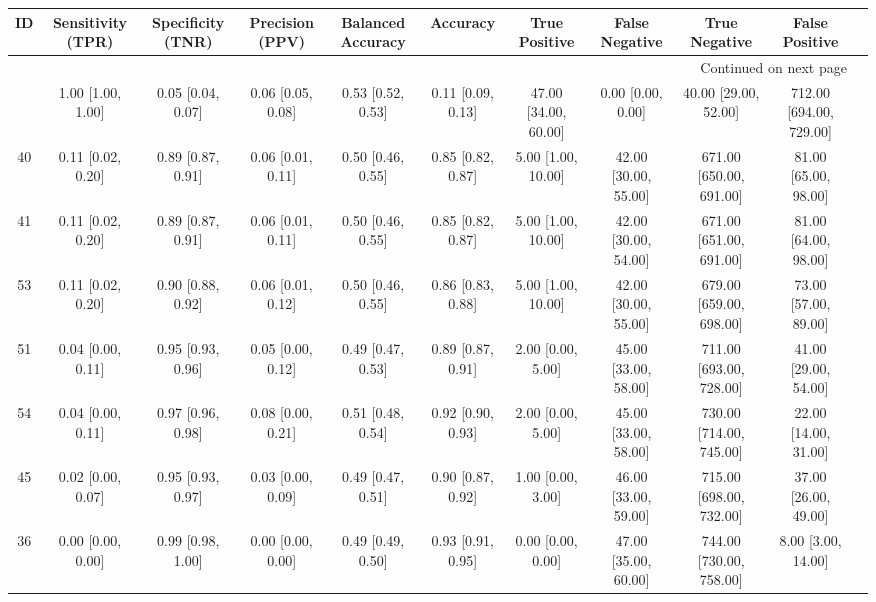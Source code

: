 \documentclass[8pt]{article}
\begin{document}
\begin{center}
\begin{footnotesize}
\begin{longtable}{|ccccccccccc|}
\toprule
 ID &  Sensitivity (TPR) &  Specificity (TNR) &    Precision (PPV) &  Balanced Accuracy &           Accuracy &         True Positive &        False Negative &            True Negative &           False Positive \\
\midrule
\endhead
\midrule
\multicolumn{10}{r}{{Continued on next page}} \\
\midrule
\endfoot

\bottomrule
\endlastfoot
 42 &  1.00 [1.00, 1.00] &  0.05 [0.04, 0.07] &  0.06 [0.05, 0.08] &  0.53 [0.52, 0.53] &  0.11 [0.09, 0.13] &  47.00 [34.00, 60.00] &     0.00 [0.00, 0.00] &     40.00 [29.00, 52.00] &  712.00 [694.00, 729.00] \\
 40 &  0.11 [0.02, 0.20] &  0.89 [0.87, 0.91] &  0.06 [0.01, 0.11] &  0.50 [0.46, 0.55] &  0.85 [0.82, 0.87] &    5.00 [1.00, 10.00] &  42.00 [30.00, 55.00] &  671.00 [650.00, 691.00] &     81.00 [65.00, 98.00] \\
 41 &  0.11 [0.02, 0.20] &  0.89 [0.87, 0.91] &  0.06 [0.01, 0.11] &  0.50 [0.46, 0.55] &  0.85 [0.82, 0.87] &    5.00 [1.00, 10.00] &  42.00 [30.00, 54.00] &  671.00 [651.00, 691.00] &     81.00 [64.00, 98.00] \\
 53 &  0.11 [0.02, 0.20] &  0.90 [0.88, 0.92] &  0.06 [0.01, 0.12] &  0.50 [0.46, 0.55] &  0.86 [0.83, 0.88] &    5.00 [1.00, 10.00] &  42.00 [30.00, 55.00] &  679.00 [659.00, 698.00] &     73.00 [57.00, 89.00] \\
 51 &  0.04 [0.00, 0.11] &  0.95 [0.93, 0.96] &  0.05 [0.00, 0.12] &  0.49 [0.47, 0.53] &  0.89 [0.87, 0.91] &     2.00 [0.00, 5.00] &  45.00 [33.00, 58.00] &  711.00 [693.00, 728.00] &     41.00 [29.00, 54.00] \\
 54 &  0.04 [0.00, 0.11] &  0.97 [0.96, 0.98] &  0.08 [0.00, 0.21] &  0.51 [0.48, 0.54] &  0.92 [0.90, 0.93] &     2.00 [0.00, 5.00] &  45.00 [33.00, 58.00] &  730.00 [714.00, 745.00] &     22.00 [14.00, 31.00] \\
 45 &  0.02 [0.00, 0.07] &  0.95 [0.93, 0.97] &  0.03 [0.00, 0.09] &  0.49 [0.47, 0.51] &  0.90 [0.87, 0.92] &     1.00 [0.00, 3.00] &  46.00 [33.00, 59.00] &  715.00 [698.00, 732.00] &     37.00 [26.00, 49.00] \\
 36 &  0.00 [0.00, 0.00] &  0.99 [0.98, 1.00] &  0.00 [0.00, 0.00] &  0.49 [0.49, 0.50] &  0.93 [0.91, 0.95] &     0.00 [0.00, 0.00] &  47.00 [35.00, 60.00] &  744.00 [730.00, 758.00] &       8.00 [3.00, 14.00] \\

\end{longtable}
\end{footnotesize}
\end{center}
\end{document}
